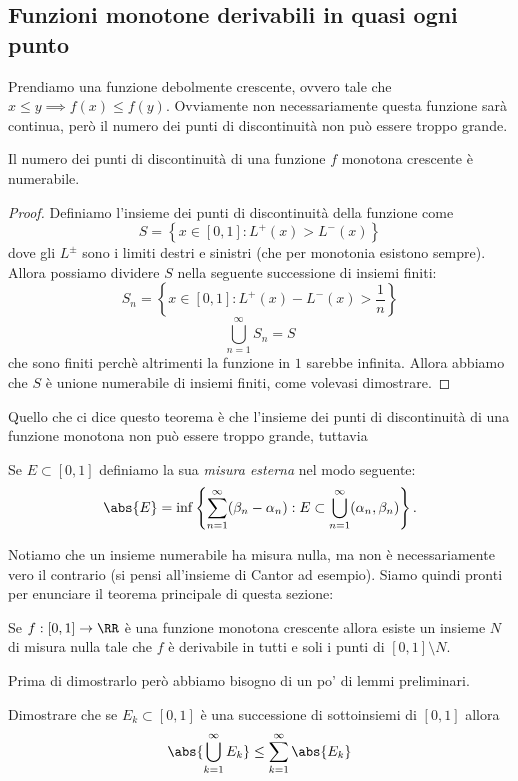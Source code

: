 \documentclass[11pt]{scrartcl}
\begin{document}
	 \subsection{Funzioni monotone derivabili in quasi ogni punto}
	 
	 Prendiamo una funzione debolmente crescente, ovvero tale che $x\le y \implies f(x)\le f(y)$. Ovviamente non necessariamente questa funzione sarà continua, però il numero dei punti di discontinuità non può essere troppo grande.
	 \begin{lemma}
	 	Il numero dei punti di discontinuità di una funzione $f$ monotona crescente è numerabile.
	 \end{lemma}
	 \begin{proof}
	 	Definiamo l'insieme dei punti di discontinuità della funzione come
	 	$$S=\left\{x\in [0,1]:L^+(x)>L^-(x)\right\}$$
	 	dove gli $L^\pm$ sono i limiti destri e sinistri (che per monotonia esistono sempre). Allora possiamo dividere $S$ nella seguente successione di insiemi finiti:
	 	$$S_n=\left\{x\in [0,1]:L^+(x)-L^-(x)>\frac{1}{n}\right\}$$
	 	$$\bigcup_{n=1}^\infty S_n=S$$
	 	che sono finiti perchè altrimenti la funzione in  $1$ sarebbe infinita. Allora abbiamo che $S$ è unione numerabile di insiemi finiti, come volevasi dimostrare.
	 \end{proof}
	 Quello che ci dice questo teorema è che l'insieme dei punti di discontinuità di una funzione monotona non può essere troppo grande, tuttavia
	 \begin{definition}
	 	Se $E\subset[0,1]$ definiamo la sua \textit{misura esterna} nel modo seguente:
	 	$$\abs{E}=\inf\left\{\sum_{n=1}^{\infty}(\beta_n-\alpha_n):E\subset \bigcup_{n=1}^\infty(\alpha_n,\beta_n)\right\}.$$
	 \end{definition}
	 Notiamo che un insieme numerabile ha misura nulla, ma non è necessariamente vero il contrario (si pensi all'insieme di Cantor ad esempio).
	 Siamo quindi pronti per enunciare il teorema principale di questa sezione:
	 \begin{theorem}[Lebesgue]
	 	Se $f:[0,1]\to\RR$ è una funzione monotona crescente allora esiste un insieme $N$ di misura nulla tale che $f$ è derivabile in tutti e soli i punti di $[0,1]\setminus N$.
	 \end{theorem}
	 Prima di dimostrarlo però abbiamo bisogno di un po' di lemmi preliminari.
	 \begin{exercise}
	 	Dimostrare che se $E_k\subset [0,1]$ è una successione di sottoinsiemi di $[0,1]$ allora 
	 	$$\abs{\bigcup_{k=1}^\infty E_k}\le \sum_{k=1}^{\infty}\abs{E_k}$$
	 \end{exercise}
\end{document}
